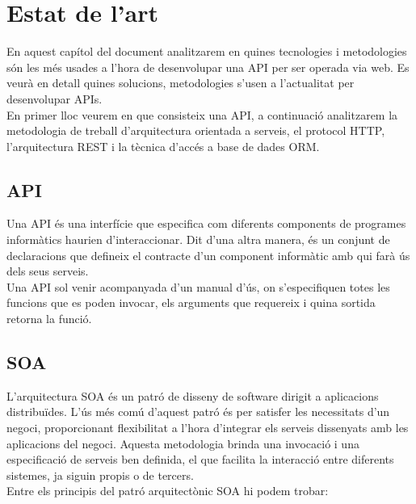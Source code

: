 
\chapter{Estat de l'art}\label{entorn}

En aquest capítol del document analitzarem en quines tecnologies i metodologies són les més usades a l'hora de desenvolupar una \ac{API} per ser operada via web. Es veurà en detall quines solucions, metodologies s'usen a l'actualitat per desenvolupar \ac{API}s.\\
 En primer lloc veurem en que consisteix una \ac{API}, a continuació analitzarem la metodologia de treball d'arquitectura orientada a serveis, el protocol \ac{HTTP}, l'arquitectura \ac{REST} i la tècnica d'accés a base de dades \ac{ORM}.

\section{\ac{API}}\label{sec_api}

Una \ac{API} és una interfície que especifica com diferents components de programes informàtics haurien d'interaccionar. Dit d'una altra manera, és un conjunt de declaracions que defineix el contracte d'un component informàtic amb qui farà ús dels seus serveis.\\

Una \ac{API} sol venir acompanyada d'un manual d'ús, on s'especifiquen totes les funcions que es poden invocar, els arguments que requereix i quina sortida retorna la funció.

\section{\ac{SOA}} \label{sec_soa}

L'arquitectura \ac{SOA} és un patró de disseny de software dirigit a aplicacions distribuïdes. L'ús més comú d'aquest patró és per satisfer les necessitats d'un negoci, proporcionant flexibilitat a l'hora d'integrar els serveis dissenyats amb les aplicacions del negoci. Aquesta metodologia brinda una invocació i una especificació de serveis ben definida, el que facilita la interacció entre diferents sistemes, ja siguin propis o de tercers.\\
\newline
Entre els principis del patró arquitectònic \ac{SOA} hi podem trobar:

